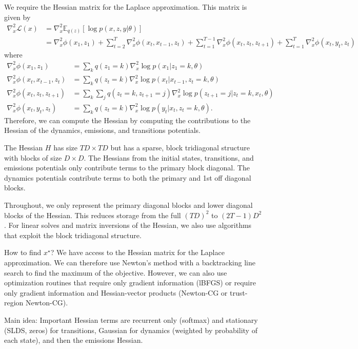\documentclass[11pt]{article}
\begin{document}
We require the Hessian matrix for the Laplace approximation. This matrix is given by
\begin{align*}
\nabla_x^2 \mathcal{L}(x) & = \nabla_x^2 \mathbb{E}_{q(z)}[\log p(x, z, y | \theta)] \\
& = \nabla_x^2 \phi(x_1, z_1) + \sum_{t=2}^T \nabla_x^2 \phi(x_t, x_{t-1}, z_t) + \sum_{t=1}^{T-1} \nabla_x^2 \phi(x_t, z_t, z_{t+1}) + \sum_{t=1}^T \nabla_x^2 \phi(x_t, y_t, z_t) 
\end{align*}
where
\begin{align*}
\nabla_x^2 \phi(x_1, z_1) & = \sum_k q(z_1 = k) \nabla_x^2 \log p(x_1 | z_1 = k, \theta) \\
\nabla_x^2 \phi(x_t, x_{t-1}, z_t)  & = \sum_{k} q(z_t = k) \nabla_x^2  \log p(x_t | x_{t-1}, z_t = k, \theta)  \\
\nabla_x^2 \phi(x_t, z_t, z_{t+1}) & = \sum_k \sum_j q(z_t = k, z_{t+1} = j) \nabla_x^2 \log p(z_{t+1} = j | z_t = k, x_t, \theta) \\
\nabla_x^2 \phi(x_t, y_t, z_t) & = \sum_k q(z_t = k) \nabla_x^2 \log p(y_t | x_t , z_t = k, \theta).
\end{align*}
Therefore, we can compute the Hessian by computing the contributions to the Hessian of the dynamics, emissions, and transitions potentials. 

The Hessian $H$ has size $TD \times TD$ but has a sparse, block tridiagonal structure with blocks of size $D \times D$. The Hessians from the initial states, transitions, and emissions potentials only contribute terms to the primary block diagonal. The dynamics potentials contribute terms to both the primary and 1st off diagonal blocks. 

Throughout, we only represent the primary diagonal blocks and lower diagonal blocks of the Hessian. This reduces storage from the full $(TD)^2$ to $(2T-1)D^2$. For linear solves and matrix inversions of the Hessian, we also use algorithms that exploit the block tridiagonal structure. 

How to find $x^\star$? We have access to the Hessian matrix for the Laplace approximation. We can therefore use Newton's method with a backtracking line search to find the maximum of the objective. However, we can also use optimization routines that require only gradient information (lBFGS) or require only gradient information and Hessian-vector products (Newton-CG or trust-region Newton-CG). 

Main idea: Important Hessian terms are recurrent only (softmax) and stationary (SLDS, zeros) for transitions, Gaussian for dynamics (weighted by probability of each state), and then the emissions Hessian. 
\end{document}
